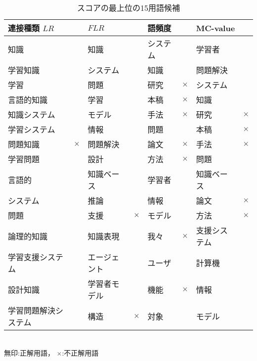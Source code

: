 \begin{table}[htbp]
\hsize\textwidth
\caption{スコアの最上位の15用語候補}
\begin{center}
\begin{tabular}{|l|c||l|c||l|c||l|c|}
\hline
連接種類 $LR$        &          & $FLR$        &          & 語頻度   &          &  MC-value    & \\ \hline
知識                 &          & 知識         &          & システム &          & 学習者       & \\
学習知識             &          & システム     &          & 知識     &          & 問題解決     & \\
学習                 &          & 問題         &          & 研究     & $\times$ & システム     & \\
言語的知識           &          & 学習         &          & 本稿     & $\times$ & 知識         & \\
知識システム         &          & モデル       &          & 手法     & $\times$ & 研究         & $\times$ \\
学習システム         &          & 情報         &          & 問題     &          & 本稿         & $\times$ \\
問題知識             & $\times$ & 問題解決     &          & 論文     & $\times$ & 手法         & $\times$ \\
学習問題             &          & 設計         &          & 方法     & $\times$ & 問題         & \\
言語的               &          & 知識ベース   &          & 学習者   &          & 知識ベース   & \\
システム             &          & 推論         &          & 情報     &          & 論文         & $\times$ \\
問題                 &          & 支援         & $\times$ & モデル   &          & 方法         & $\times$ \\
論理的知識           &          & 知識表現     &          & 我々     & $\times$ & 支援システム & \\
学習支援システム     &          & エージェント &          & ユーザ   &          & 計算機       & \\
設計知識             &          & 学習者モデル &          & 機能     & $\times$ & 情報         & \\
学習問題解決システム &          & 構造         & $\times$ & 対象     &          & モデル       & \\
\hline
\end{tabular}\\
無印:正解用語， $\times$:不正解用語
\end{center}
\label{table:15}
\end{table}

